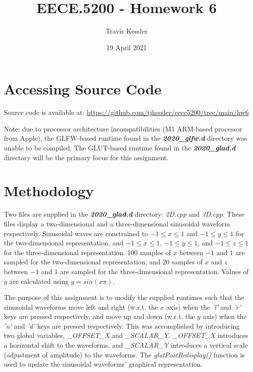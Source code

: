 \documentclass{report}
\title{EECE.5200 - Homework 6}
\author{Travis Kessler}
\date{19 April 2021}
\begin{document}
	\maketitle
	\newpage

	\lstset{frame=lines}

	\section*{Accessing Source Code}
	
	Source code is available at: \href{https://github.com/tjkessler/eece5200/tree/main/hw6}{https://github.com/tjkessler/eece5200/tree/main/hw6}
	
	\textit{}
	
	\noindent Note: due to processor architecture incompatibilities (M1 ARM-based processor from Apple), the GLFW-based runtime found in the \textbf{\textit{2020\_glfw.d}} directory was unable to be compiled. The GLUT-based runtime found in the \textbf{\textit{2020\_glad.d}} directory will be the primary focus for this assignment.

	\section*{Methodology}
	
	Two files are supplied in the \textbf{\textit{2020\_glad.d}} directory: \textit{2D.cpp} and \textit{3D.cpp}. These files display a two-dimensional and a three-dimensional sinusoidal waveform respectively. Sinusoidal waves are constrained to $-1 \leq x \leq 1$ and $-1 \leq y \leq 1$ for the two-dimensional representation, and $-1 \leq x \leq 1$, $-1 \leq y \leq 1$, and $-1 \leq z \leq 1$ for the three-dimensional representation. 100 samples of $x$ between $-1$ and $1$ are sampled for the two-dimensional representation, and 20 samples of $x$ and $z$ between $-1$ and $1$ are sampled for the three-dimensional representation. Values of $y$ are calculated using $y = sin(x\pi)$.
	
	\textit{}
	
	\noindent The purpose of this assignment is to modify the supplied runtimes such that the sinusoidal waveforms move left and right (w.r.t. the $x$ axis) when the \textit{'l'} and \textit{'r'} keys are pressed respectively, and move up and down (w.r.t. the $y$ axis) when the \textit{'u'} and \textit{'d'} keys are pressed respectively. This was accomplished by introducing two global variables, \textit{\_OFFSET\_X} and \textit{\_SCALAR\_Y}. \textit{\_OFFSET\_X} introduces a horizontal shift to the waveforms, and \textit{\_SCALAR\_Y} introduces a vertical scale (adjustment of amplitude) to the waveforms. The \textit{glutPostRedisplay()} function is used to update the sinusoidal waveforms' graphical representation.
	
\end{document}

